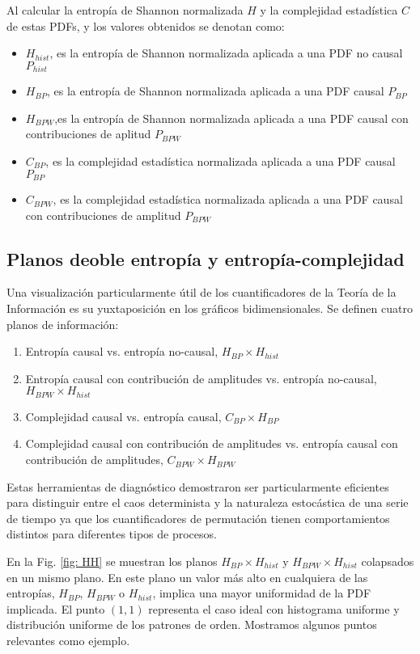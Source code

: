 Al calcular la entropía de Shannon normalizada $H$ y la complejidad estadística $C$ de estas PDFs, y los valores obtenidos se denotan como:
\begin{itemize}
	\item $H_{hist}$, es la entropía de Shannon normalizada aplicada a una PDF no causal $P_{hist}$
	\item $H_{BP}$, es la entropía de Shannon normalizada aplicada a una PDF causal $P_{BP}$
	\item $H_{BPW}$,es la entropía de Shannon normalizada aplicada a una PDF causal con contribuciones de aplitud $P_{BPW}$
	\item $C_{BP}$, es la complejidad estadística normalizada aplicada a una PDF causal $P_{BP}$
	\item $C_{BPW}$, es la complejidad estadística normalizada aplicada a una PDF causal con contribuciones de amplitud $P_{BPW} $
\end{itemize}

\subsection{Planos deoble entropía y entropía-complejidad}

Una visualización particularmente útil de los cuantificadores de la Teoría de la Información es su yuxtaposición en los gráficos bidimensionales.
Se definen cuatro planos de información:
\begin{enumerate}
	\item Entropía causal vs. entropía no-causal, $H_{BP} \times H_{hist}$
	\item Entropía causal con contribución de amplitudes vs. entropía no-causal, $H_{BPW} \times H_{hist}$
	\item Complejidad causal vs. entropía causal, $C_{BP} \times H_{BP}$
	\item Complejidad causal con contribución de amplitudes vs. entropía causal con contribución de amplitudes, $C_{BPW} \times H_{BPW}$
\end{enumerate}

Estas herramientas de diagnóstico demostraron ser particularmente eficientes para distinguir entre el caos determinista y la naturaleza estocástica de una serie de tiempo ya que los cuantificadores de permutación tienen comportamientos distintos para diferentes tipos de procesos.

En la Fig. \ref{fig: HH} se muestran los planos $H_ {BP} \times H_{hist}$ y $H_{BPW} \times H_{hist}$ colapsados en un mismo plano.
En este plano un valor más alto en cualquiera de las entropías, $H_{BP}$, $H_{BPW}$ o $H_{hist}$, implica una mayor uniformidad de la PDF implicada.
El punto $(1, 1)$ representa el caso ideal con histograma uniforme y distribución uniforme de los patrones de orden.
Mostramos algunos puntos relevantes como ejemplo.

